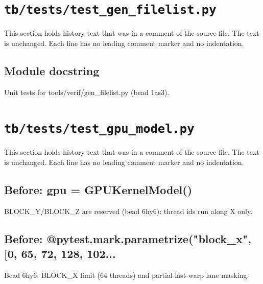 \section{\texttt{tb/tests/test\_gen\_filelist.py}}\label{cr:suite:test-gen-filelist}

This section holds history text that was in a comment of the source file. The text is unchanged. Each line has no leading comment marker and no indentation.

\begin{record}

\subsection*{Module docstring}

\begin{textblock}
Unit tests for tools/verif/gen_filelist.py (bead 1as3).
\end{textblock}

\end{record}

\section{\texttt{tb/tests/test\_gpu\_model.py}}\label{cr:suite:test-gpu-model}

This section holds history text that was in a comment of the source file. The text is unchanged. Each line has no leading comment marker and no indentation.

\begin{record}

\subsection*{Before: gpu = GPUKernelModel()}

\begin{textblock}
BLOCK_Y/BLOCK_Z are reserved (bead 6hy6): thread ids run along X only.
\end{textblock}

\subsection*{Before: @pytest.mark.parametrize("block\_x", [0, 65, 72, 128, 102...}

\begin{textblock}
Bead 6hy6: BLOCK_X limit (64 threads) and partial-last-warp lane masking.
\end{textblock}

\end{record}

